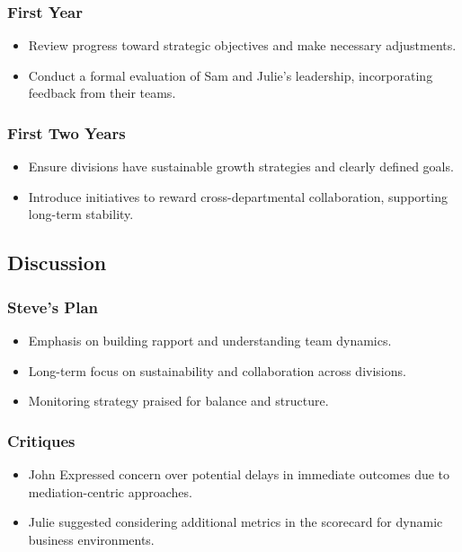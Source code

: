 \documentclass[a4paper,12pt]{article}
\begin{document}
\subsubsection{First Year}
\begin{itemize}
    \item Review progress toward strategic objectives and make necessary adjustments.
    \item Conduct a formal evaluation of Sam and Julie’s leadership, incorporating feedback from their teams.
\end{itemize}

\subsubsection{First Two Years}
\begin{itemize}
    \item Ensure divisions have sustainable growth strategies and clearly defined goals.
    \item Introduce initiatives to reward cross-departmental collaboration, supporting long-term stability.
\end{itemize}

\subsection{Discussion}
\subsubsection{Steve's Plan}
\begin{itemize}
    \item Emphasis on building rapport and understanding team dynamics.
    \item Long-term focus on sustainability and collaboration across divisions.
    \item Monitoring strategy praised for balance and structure.
\end{itemize}

\subsubsection{Critiques}
\begin{itemize}
    \item John Expressed concern over potential delays in immediate outcomes due to mediation-centric approaches.
    \item Julie suggested considering additional metrics in the scorecard for dynamic business environments.
\end{itemize}
\end{document}
